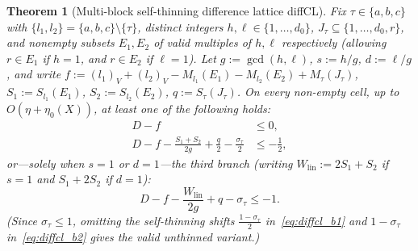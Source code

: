 \documentclass[11pt,a4paper]{amsart}
\theoremstyle{plain}
\newtheorem{theorem}{Theorem}[section]
\theoremstyle{definition}
\theoremstyle{remark}
\begin{document}
\begin{theorem}[Multi-block self-thinning difference lattice \textsf{diffCL}]\label{thm:diffcl}
Fix $\tau \in \{a,b,c\}$ with $\{l_1,l_2\} = \{a,b,c\}\setminus\{\tau\}$, distinct integers $h, \ell \in \{1,\dots,d_0\}$, $J_\tau \subseteq \{1,\dots,d_0,r\}$, and nonempty subsets $E_1, E_2$ of valid multiples of $h, \ell$ respectively (allowing $r \in E_1$ if $h=1$, and $r \in E_2$ if $\ell=1$). Let $g := \gcd(h,\ell)$, $s := h/g$, $d := \ell/g$, and write $f := (l_1)_V + (l_2)_V - M_{l_1}(E_1) - M_{l_2}(E_2) + M_\tau(J_\tau)$, $S_1 := S_{l_1}(E_1)$, $S_2 := S_{l_2}(E_2)$, $q := S_\tau(J_\tau)$. On every non-empty cell, up to $O(\eta + \eta_0(X))$, at least one of the following holds:
\begin{align}
  D - f &\le 0, \label{eq:diffcl_b0} \\
  D - f - \frac{S_1 + S_2}{2g} + \frac{q}{2} - \frac{\sigma_\tau}{2} &\le -\frac{1}{2}, \label{eq:diffcl_b1}
\end{align}
or—solely when $s = 1$ or $d = 1$—the third branch (writing $W_{\mathrm{lin}} := 2 S_1 + S_2$ if $s=1$ and $S_1 + 2 S_2$ if $d=1$):
\begin{equation}\label{eq:diffcl_b2}
  D - f - \frac{W_{\mathrm{lin}}}{2g} + q - \sigma_\tau \le -1.
\end{equation}
(Since $\sigma_\tau \le 1$, omitting the self-thinning shifts $\frac{1-\sigma_\tau}{2}$ in~\eqref{eq:diffcl_b1} and $1-\sigma_\tau$ in~\eqref{eq:diffcl_b2} gives the valid unthinned variant.)
\end{theorem}
\end{document}
